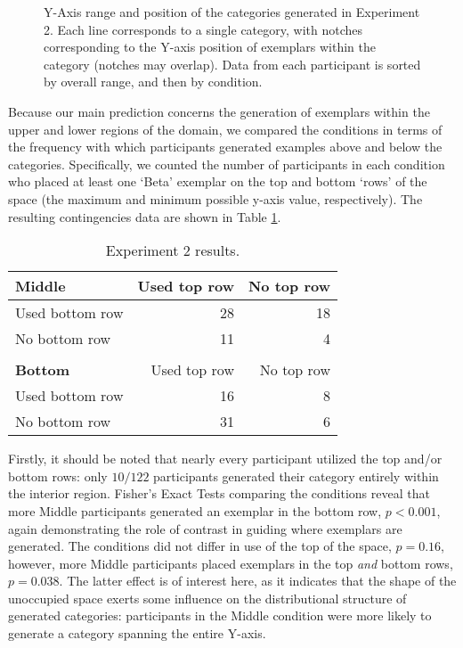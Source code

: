\documentclass[12pt]{article}
\newcommand\inputpgf[2]{{
\let\pgfimageWithoutPath\pgfimage
\renewcommand{\pgfimage}[2][]{\pgfimageWithoutPath[##1]{#1/##2}}

}}
\begin{document}
\begin{flushleft}
\begin{figure}
    \begin{center}
    \inputpgf{figs/}{e2-yranges.pgf}
    \caption{Y-Axis range and position of the categories generated in Experiment 2. Each line corresponds to a single category, with notches corresponding to the Y-axis position of exemplars within the category (notches may overlap). Data from each participant is sorted by overall range, and then by condition. }
    \label{fig:e2-yranges}
    \end{center}
\end{figure}

Because our main prediction concerns the generation of exemplars within the upper and lower regions of the domain, we compared the conditions in terms of the frequency with which participants generated examples above and below the categories. Specifically, we counted the number of participants in each condition who placed at least one `Beta' exemplar on the top and bottom `rows' of the space (the maximum and minimum possible y-axis value, respectively). The resulting contingencies data are shown in Table \ref{table:e2-subset-table}. 

\begin{table}
\begin{center} 
\caption{Experiment 2 results.} 
\label{table:e2-subset-table} 
\vskip 0.12in
\begin{tabular}{ l r r}
    \textbf{Middle}         & Used top row & No top row \\
    \hline
    Used bottom row       &  28 & 18  \\
    No bottom row          &  11 &  4  \\
    \\
    \textbf{Bottom}         & Used top row & No top row \\
    \hline
    Used bottom row        & 16 & 8 \\
    No bottom row          & 31 & 6 \\
\end{tabular}
\end{center} 
\end{table}


Firstly, it should be noted that nearly every participant utilized the top and/or bottom rows: only $10 / 122$ participants generated their category entirely within the interior region. Fisher's Exact Tests comparing the conditions reveal that more Middle participants generated an exemplar in the bottom row, $p < 0.001$, again demonstrating the role of contrast in guiding where exemplars are generated. The conditions did not differ in use of the top of the space, $p = 0.16$, however, more Middle participants placed exemplars in the top {\em and} bottom rows, $p = 0.038$. The latter effect is of interest here, as it indicates that the shape of the unoccupied space exerts some influence on the distributional structure of generated categories: participants in the Middle condition were more likely to generate a category spanning the entire Y-axis.


\end{flushleft}
\end{document}
